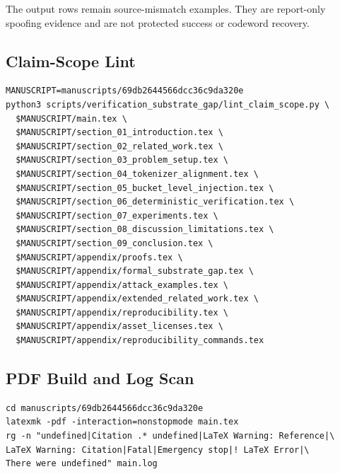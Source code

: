 The output rows remain source-mismatch examples.  They are report-only
spoofing evidence and are not protected success or codeword recovery.

\subsection{Claim-Scope Lint}

\begingroup\footnotesize
\begin{verbatim}
MANUSCRIPT=manuscripts/69db2644566dcc36c9da320e
python3 scripts/verification_substrate_gap/lint_claim_scope.py \
  $MANUSCRIPT/main.tex \
  $MANUSCRIPT/section_01_introduction.tex \
  $MANUSCRIPT/section_02_related_work.tex \
  $MANUSCRIPT/section_03_problem_setup.tex \
  $MANUSCRIPT/section_04_tokenizer_alignment.tex \
  $MANUSCRIPT/section_05_bucket_level_injection.tex \
  $MANUSCRIPT/section_06_deterministic_verification.tex \
  $MANUSCRIPT/section_07_experiments.tex \
  $MANUSCRIPT/section_08_discussion_limitations.tex \
  $MANUSCRIPT/section_09_conclusion.tex \
  $MANUSCRIPT/appendix/proofs.tex \
  $MANUSCRIPT/appendix/formal_substrate_gap.tex \
  $MANUSCRIPT/appendix/attack_examples.tex \
  $MANUSCRIPT/appendix/extended_related_work.tex \
  $MANUSCRIPT/appendix/reproducibility.tex \
  $MANUSCRIPT/appendix/asset_licenses.tex \
  $MANUSCRIPT/appendix/reproducibility_commands.tex
\end{verbatim}
\endgroup

\subsection{PDF Build and Log Scan}

\begingroup\footnotesize
\begin{verbatim}
cd manuscripts/69db2644566dcc36c9da320e
latexmk -pdf -interaction=nonstopmode main.tex
rg -n "undefined|Citation .* undefined|LaTeX Warning: Reference|\
LaTeX Warning: Citation|Fatal|Emergency stop|! LaTeX Error|\
There were undefined" main.log
\end{verbatim}
\endgroup
